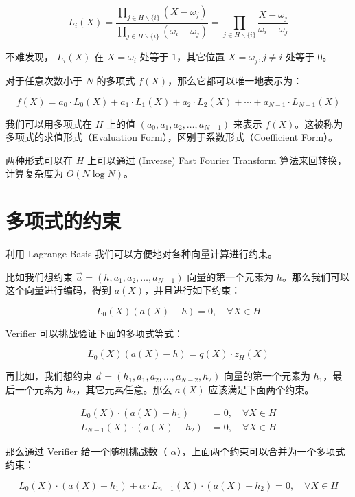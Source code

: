 \[
L_i(X) = \frac{\prod_{j\in H\backslash\{i\}}(X-\omega_j)}{\prod_{j\in H\backslash\{i\}}(\omega_i-\omega_j)} = \prod_{j\in H\backslash\{i\}}^{} \frac{X-\omega_j}{\omega_i-\omega_j}
\]

不难发现， \(L_i(X)\) 在 \(X=\omega_i\) 处等于 \(1\)，其它位置
\(X=\omega_j, j\neq i\) 处等于 \(0\)。

对于任意次数小于 \(N\) 的多项式 \(f(X)\)，那么它都可以唯一地表示为：

\[
f(X)=a_0\cdot L_0(X)+a_1\cdot L_1(X)+a_2\cdot L_2(X)+ \cdots + a_{N-1}\cdot L_{N-1}(X)
\]

我们可以用多项式在 \(H\) 上的值 \((a_0,a_1,a_2,\ldots,a_{N-1})\) 来表示
\(f(X)\)。这被称为 多项式的求值形式（Evaluation
Form），区别于系数形式（Coefficient Form）。

两种形式可以在 \(H\) 上可以通过 (Inverse) Fast Fourier Transform
算法来回转换，计算复杂度为 \(O(N\log{N})\)。

\hypertarget{ux591aux9879ux5f0fux7684ux7ea6ux675f}{%
\section{多项式的约束}\label{ux591aux9879ux5f0fux7684ux7ea6ux675f}}

利用 Lagrange Basis 我们可以方便地对各种向量计算进行约束。

比如我们想约束 \(\vec{a}=(h,a_1,a_2,\ldots,a_{N-1})\) 向量的第一个元素为
\(h\)。那么我们可以这个向量进行编码，得到 \(a(X)\)，并且进行如下约束：

\[
L_0(X)(a(X)-h) = 0, \quad \forall X\in H
\]

Verifier 可以挑战验证下面的多项式等式：

\[
L_0(X)(a(X)-h) = q(X)\cdot z_H(X)
\]

再比如，我们想约束 \(\vec{a}=(h_1,a_1,a_2,\ldots,a_{N-2},h_2)\)
向量的第一个元素为 \(h_1\)，最后一个元素为 \(h_2\)，其它元素任意。那么
\(a(X)\) 应该满足下面两个约束。

\[
\begin{split}
L_0(X)\cdot (a(X)-h_1) &= 0, \quad \forall X\in H\\
L_{N-1}(X)\cdot(a(X)-h_2) &= 0, \quad \forall X\in H
\end{split}
\]

那么通过 Verifier 给一个随机挑战数（
\(\alpha\)），上面两个约束可以合并为一个多项式约束：

\[
L_0(X)\cdot (a(X)-h_1) + \alpha\cdot L_{n-1}(X)\cdot(a(X)-h_2) = 0, \quad \forall X\in H
\]

